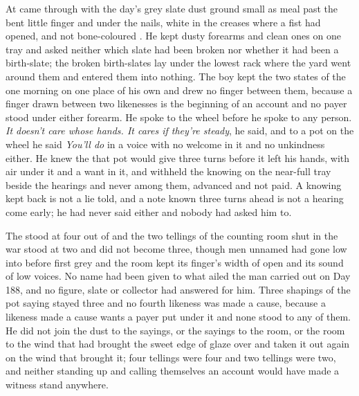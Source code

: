 At   came through with the day's grey slate dust ground small as meal past the bent little finger and under the nails, white in the creases where a fist had opened, and not bone-coloured . He kept dusty forearms and clean ones on one tray and asked neither which slate had been broken nor whether it had been a birth-slate; the broken birth-slates lay under the lowest rack where the yard went around them and entered them into nothing. The boy kept the two states of the one morning on one place of his own and drew no finger between them, because a finger drawn between two likenesses is the beginning of an account and no payer stood under either forearm. He spoke to the wheel before he spoke to any person. \emph{It doesn’t care whose hands. It cares if they’re steady}, he said, and to a pot on the wheel he said \emph{You’ll do} in a voice with no welcome in it and no unkindness either. He knew the  that pot would give three turns before it left his hands, with air under it and a want in it, and withheld the knowing on the near-full tray beside the hearings and never among them, advanced and not paid. A knowing kept back is not a lie told, and a note known three turns ahead is not a hearing come early; he had never said either and nobody had asked him to.

The  stood at four out of  and the two tellings of the counting room shut in the war stood at two and did not become three, though men unnamed had gone low into  before first grey and the room kept its finger's width of open and its sound of low voices. No name had been given to what ailed the man carried out on Day 188, and no figure, slate or collector had answered for him. Three shapings of the pot saying stayed three and no fourth likeness was made a cause, because a likeness made a cause wants a payer put under it and none stood to any of them. He did not join the dust to the sayings, or the sayings to the room, or the room to the wind that had brought the sweet edge of glaze over  and taken it out again on the wind that brought it; four tellings were four and two tellings were two, and neither standing up and calling themselves an account would have made a witness stand anywhere.

